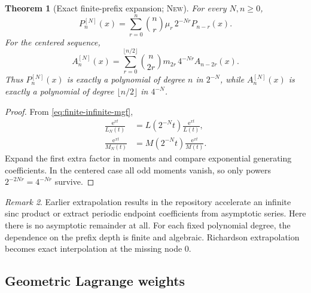 \documentclass[11pt,oneside]{article}
\theoremstyle{frontier}
\newtheorem{theorem}{Theorem}[section]
\theoremstyle{definition}
\theoremstyle{remark}
\newtheorem{remark}[theorem]{Remark}
\newcommand{\e}{\mathrm e}
\newcommand{\statusnew}{\textsc{New}}
\begin{document}
\begin{theorem}[Exact finite-prefix expansion; \statusnew]
\label{thm:finite-prefix-expansion}
For every $N,n\ge0$,
\begin{equation}
 \boxed{
 P_n^{[N]}(x)
 =\sum_{r=0}^{n}\binom nr\mu_r\,2^{-Nr}P_{n-r}(x).
 }
 \label{eq:P-prefix-expansion}
\end{equation}
For the centered sequence,
\begin{equation}
 \boxed{
 A_n^{[N]}(x)
 =\sum_{r=0}^{\lfloor n/2\rfloor}
 \binom n{2r}m_{2r}\,4^{-Nr}A_{n-2r}(x).
 }
 \label{eq:A-prefix-expansion}
\end{equation}
Thus $P_n^{[N]}(x)$ is exactly a polynomial of degree $n$ in $2^{-N}$, while
$A_n^{[N]}(x)$ is exactly a polynomial of degree $\lfloor n/2\rfloor$ in $4^{-N}$.
\end{theorem}

\begin{proof}
From \eqref{eq:finite-infinite-mgf},
\begin{align*}
 \frac{\e^{xt}}{L_N(t)}
 &=L(2^{-N}t)\frac{\e^{xt}}{L(t)},\\
 \frac{\e^{xt}}{M_N(t)}
 &=M(2^{-N}t)\frac{\e^{xt}}{M(t)}.
\end{align*}
Expand the first extra factor in moments and compare exponential generating coefficients.  In the
centered case all odd moments vanish, so only powers $2^{-2Nr}=4^{-Nr}$ survive.
\end{proof}

\begin{remark}
Earlier extrapolation results in the repository accelerate an infinite sinc product or extract
periodic endpoint coefficients from asymptotic series.  Here there is no asymptotic remainder at
all.  For each fixed polynomial degree, the dependence on the prefix depth is finite and algebraic.
Richardson extrapolation becomes exact interpolation at the missing node $0$.
\end{remark}

\subsection{Geometric Lagrange weights}
\end{document}
